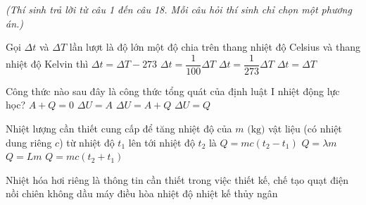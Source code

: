 \vspace{0.15cm}
\begin{flushleft}
	{\color{blue!50!green}}
	\textit{\small (Thí sinh trả lời từ câu 1 đến câu 18. Mỗi câu hỏi thí sinh chỉ chọn một phương án.)}
\end{flushleft}
\setcounter{ex}{0}
\setcounter{bt}{0}

\begin{ex}
	Gọi $\Delta t$ và $\Delta T$ lần lượt là độ lớn một độ chia trên thang nhiệt độ Celsius và thang nhiệt độ Kelvin thì
	\choice
	{$\Delta t = \Delta T - 273$}
	{$\Delta t = \dfrac{1}{100} \Delta T$}
	{$\Delta t = \dfrac{1}{273} \Delta T$}
	{\True $\Delta t = \Delta T$}
\end{ex}

\begin{ex}
	Công thức nào sau đây là công thức tổng quát của định luật I nhiệt động lực học?
	\choice
	{$A + Q = 0$}
	{$\Delta U = A$}
	{\True $\Delta U = A + Q$}
	{$\Delta U = Q$}
\end{ex}

\begin{ex}
	Nhiệt lượng cần thiết cung cấp để tăng nhiệt độ của $m\text{ (kg)}$ vật liệu (có nhiệt dung riêng $c$) từ nhiệt độ $t_1$ lên tới nhiệt độ $t_2$ là
	\choice
	{\True $Q = mc(t_2 - t_1)$}
	{$Q = \lambda m$}
	{$Q = Lm$}
	{$Q = mc(t_2 + t_1)$}
\end{ex}

\begin{ex}
	Nhiệt hóa hơi riêng là thông tin cần thiết trong việc thiết kế, chế tạo
	\choice
	{quạt điện}
	{nồi chiên không dầu}
	{\True máy điều hòa nhiệt độ}
	{nhiệt kế thủy ngân}
\end{ex}

